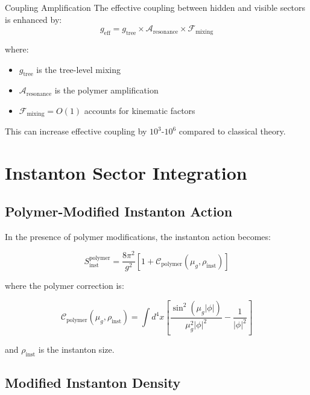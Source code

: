 \documentclass[12pt]{article}
\begin{document}
\begin{resultbox}{Coupling Amplification}
The effective coupling between hidden and visible sectors is enhanced by:
\begin{equation}
g_{\text{eff}} = g_{\text{tree}} \times \mathcal{A}_{\text{resonance}} \times \mathcal{F}_{\text{mixing}}
\end{equation}

where:
\begin{itemize}
\item $g_{\text{tree}}$ is the tree-level mixing
\item $\mathcal{A}_{\text{resonance}}$ is the polymer amplification
\item $\mathcal{F}_{\text{mixing}} = O(1)$ accounts for kinematic factors
\end{itemize}

This can increase effective coupling by $10^3$-$10^6$ compared to classical theory.
\end{resultbox}

\section{Instanton Sector Integration}

\subsection{Polymer-Modified Instanton Action}

In the presence of polymer modifications, the instanton action becomes:

\begin{equation}
S_{\text{inst}}^{\text{polymer}} = \frac{8\pi^2}{g^2} \left[ 1 + \mathcal{C}_{\text{polymer}}(\mu_g, \rho_{\text{inst}}) \right]
\end{equation}

where the polymer correction is:

\begin{equation}
\mathcal{C}_{\text{polymer}}(\mu_g, \rho_{\text{inst}}) = \int d^4x \left[ \frac{\sin^2(\mu_g |\phi|)}{\mu_g^2 |\phi|^2} - \frac{1}{|\phi|^2} \right]
\end{equation}

and $\rho_{\text{inst}}$ is the instanton size.

\subsection{Modified Instanton Density}
\end{document}
